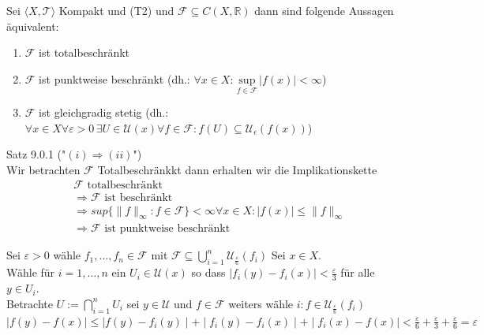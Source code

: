 \chapter{}

{
    Sei $\langle X, \mathcal{T}\rangle$ Kompakt und (T2) 
    und $\mathscr{F} \subseteq C(X,\mathbb{R})$
    dann sind folgende Aussagen äquivalent:
    \begin{enumerate}
        \item[(i)] $\mathscr{F}$ ist totalbeschränkt
        \item[(ii)] $\mathscr{F}$ ist punktweise beschränkt 
        (dh.: $\forall x \in X: \underset{f \in \mathscr{F}}{\text{ sup }} |f(x)| < \infty$)
        \item[(iii)] $\mathscr{F}$ ist gleichgradig stetig 
        (dh.: $\forall x \in X \forall \varepsilon > 0 \, \exists U \in \mathcal{U}(x) 
        \forall f \in \mathscr{F}: f(U)\subseteq \mathcal{U}_{\epsilon}(f(x))$)
    \end{enumerate}
}

\begin{myproof}{Satz 9.0.1 ("$(i) \Rightarrow (ii)$")}\\
    Wir betrachten $\mathcal{F}$ Totalbeschränkkt dann erhalten wir die 
        Implikationskette
        \begin{equation*}
            \begin{split}
                &\mathscr{F} \text{ totalbeschränkt }\\
                &\Rightarrow \mathscr{F}\text{ ist beschränkt } \\
                &\Rightarrow sup\{\|f\|_{\infty} : f \in \mathscr{F}\} < \infty \forall x \in X: \mid f(x)\mid \leq \|f\|_{\infty}\\
                &\Rightarrow \mathscr{F} \text{ ist punktweise beschränkt }
            \end{split}
        \end{equation*}
        
        Sei $\varepsilon > 0$ wähle $f_1, \ldots, f_n \in \mathscr{F}$ mit 
        $\mathscr{F} \subseteq \bigcup_{i=1}^{n} \mathcal{U}_{\frac{\varepsilon}{6}}(f_i)$
        Sei $x \in X$. \\
        Wähle für $i = 1, \ldots, n$ ein $U_i \in \mathcal{U}(x)$ so dass
        $\mid f_i(y) - f_i(x) \mid < \frac{\varepsilon}{3}$ für alle $y \in U_i$.\\
        Betrachte $U := \bigcap_{i=1}^{n} U_i $ sei $y \in \mathcal{U} \text{ und } 
        f \in \mathscr{F}$
        weiters wähle $i: f \in \mathcal{U}_{\frac{\varepsilon}{6}}(f_i)$
        $\mid f(y) - f(x) \mid \leq \mid f(y) - f_i(y) \mid + 
        \mid f_i(y) - f_i(x) \mid + \mid f_i(x) - f(x) \mid < \frac{\varepsilon}{6} 
        + \frac{\varepsilon}{3} + \frac{\varepsilon}{6} = \varepsilon$
\end{myproof}

